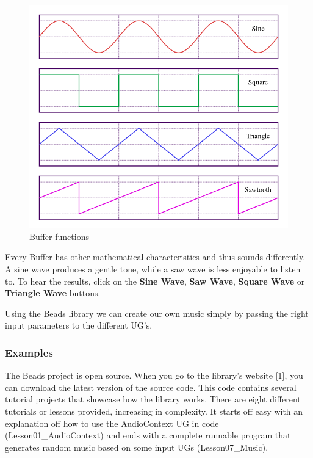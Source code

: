 \documentclass[12pt]{article}
\begin{document}
\begin{figure}[h]
\centering
\includegraphics[scale=0.45]{img/waveForms}
\caption{Buffer functions}
\end{figure}

Every Buffer has other mathematical characteristics and thus sounds differently. A sine wave produces a gentle tone, while a saw wave is less enjoyable to listen to. To hear the results, click on the \textbf{Sine Wave}, \textbf{Saw Wave}, \textbf{Square Wave} or \textbf{Triangle Wave} buttons.
\newline

Using the Beads library we can create our own music simply by passing the right input parameters to the different UG's.

\subsubsection{Examples}

The Beads project is open source. When you go to the library's website [1], you can download the latest version of the source code. This code contains several tutorial projects that showcase how the library works. There are eight different tutorials or lessons provided, increasing in complexity. It starts off easy with an explanation off how to use the AudioContext UG in code (Lesson01\_AudioContext) and ends with a complete runnable program that generates random music based on some input UGs (Lesson07\_Music).
\newline
\end{document}

